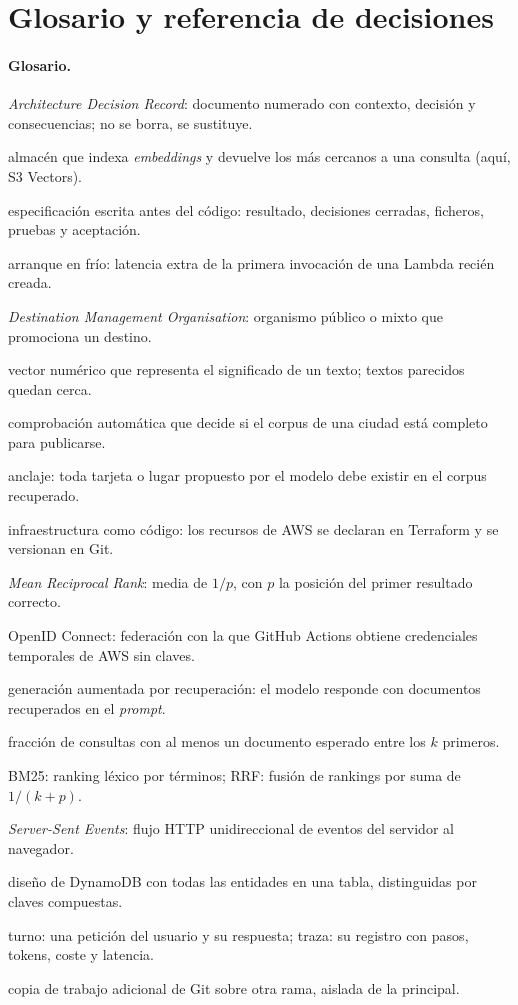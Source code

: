 \appendix
\section{Glosario y referencia de decisiones}\label{sec:12-anexo}
{\footnotesize
\paragraph{Glosario.}
\begin{description}[font=\normalfont\bfseries,leftmargin=0pt,itemsep=0pt]
\item[ADR] \emph{Architecture Decision Record}: documento numerado con contexto, decisión y consecuencias; no se borra, se sustituye.
\item[Base de datos vectorial] almacén que indexa \emph{embeddings} y devuelve los más cercanos a una consulta (aquí, S3 Vectors).
\item[Brief] especificación escrita antes del código: resultado, decisiones cerradas, ficheros, pruebas y aceptación.
\item[Cold start] arranque en frío: latencia extra de la primera invocación de una Lambda recién creada.
\item[DMO] \emph{Destination Management Organisation}: organismo público o mixto que promociona un destino.
\item[Embedding] vector numérico que representa el significado de un texto; textos parecidos quedan cerca.
\item[Gate de readiness] comprobación automática que decide si el corpus de una ciudad está completo para publicarse.
\item[Grounding] anclaje: toda tarjeta o lugar propuesto por el modelo debe existir en el corpus recuperado.
\item[IaC] infraestructura como código: los recursos de AWS se declaran en Terraform y se versionan en Git.
\item[MRR] \emph{Mean Reciprocal Rank}: media de $1/p$, con $p$ la posición del primer resultado correcto.
\item[OIDC] OpenID Connect: federación con la que GitHub Actions obtiene credenciales temporales de AWS sin claves.
\item[RAG] generación aumentada por recuperación: el modelo responde con documentos recuperados en el \emph{prompt}.
\item[Recall@$k$] fracción de consultas con al menos un documento esperado entre los $k$ primeros.
\item[RRF / BM25] BM25: ranking léxico por términos; RRF: fusión de rankings por suma de $1/(k+p)$.
\item[SSE] \emph{Server-Sent Events}: flujo HTTP unidireccional de eventos del servidor al navegador.
\item[Tabla única] diseño de DynamoDB con todas las entidades en una tabla, distinguidas por claves compuestas.
\item[Turno / traza] turno: una petición del usuario y su respuesta; traza: su registro con pasos, tokens, coste y latencia.
\item[Worktree] copia de trabajo adicional de Git sobre otra rama, aislada de la principal.
\end{description}

}

